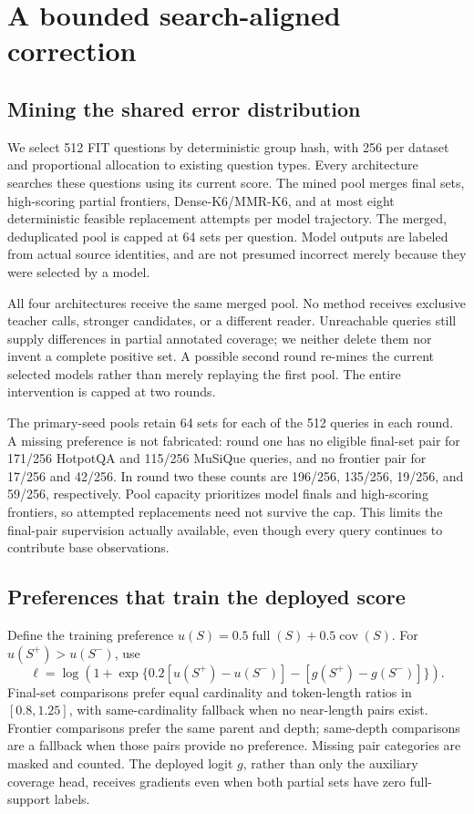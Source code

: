 \documentclass[pdflatex,sn-mathphys-num]{sn-jnl}
\begin{document}
\section{A bounded search-aligned correction}
\subsection{Mining the shared error distribution}
We select 512 FIT questions by deterministic group hash, with 256 per
dataset and proportional allocation to existing question types. Every
architecture searches these questions using its current score. The mined
pool merges final sets, high-scoring partial frontiers, Dense-K6/MMR-K6,
and at most eight deterministic feasible replacement attempts per model
trajectory. The merged, deduplicated pool is capped at 64 sets per question.
Model outputs are labeled from actual source identities, and are not
presumed incorrect merely because they were selected by a model.

All four architectures receive the same merged pool. No method receives
exclusive teacher calls, stronger candidates, or a different reader.
Unreachable queries still supply differences in partial annotated coverage;
we neither delete them nor invent a complete positive set. A possible second
round re-mines the current selected models rather than merely replaying the
first pool. The entire intervention is capped at two rounds.

The primary-seed pools retain 64 sets for each of the 512 queries in each
round. A missing preference is not fabricated: round one has no eligible
final-set pair for 171/256 HotpotQA and 115/256 MuSiQue queries, and no
frontier pair for 17/256 and 42/256. In round two these counts are 196/256,
135/256, 19/256, and 59/256, respectively. Pool capacity prioritizes model
finals and high-scoring frontiers, so attempted replacements need not survive
the cap. This limits the final-pair supervision actually available, even
though every query continues to contribute base observations.

\subsection{Preferences that train the deployed score}
Define the training preference $u(S)=0.5\operatorname{full}(S)+
0.5\operatorname{cov}(S)$. For $u(S^+)>u(S^-)$, use
\begin{equation}\label{eq:pair}
\ell=\log\!\left(1+\exp\{0.2[u(S^+)-u(S^-)]
-[g(S^+)-g(S^-)]\}\right).
\end{equation}
Final-set comparisons prefer equal cardinality and token-length ratios in
$[0.8,1.25]$, with same-cardinality fallback when no near-length pairs exist.
Frontier comparisons prefer the same parent and depth; same-depth comparisons
are a fallback when those pairs provide no preference. Missing pair
categories are masked and counted. The deployed logit $g$, rather than only
the auxiliary coverage head, receives gradients even when both partial
sets have zero full-support labels.
\end{document}
